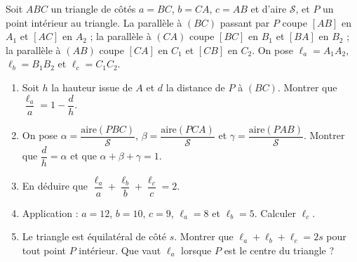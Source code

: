 
Soit $ABC$ un triangle de côtés $a=BC$, $b=CA$, $c=AB$ et d'aire $\mathcal S$, et $P$ un point intérieur au triangle. La parallèle à $(BC)$ passant par $P$ coupe $[AB]$ en $A_1$ et $[AC]$ en $A_2$ ; la parallèle à $(CA)$ coupe $[BC]$ en $B_1$ et $[BA]$ en $B_2$ ; la parallèle à $(AB)$ coupe $[CA]$ en $C_1$ et $[CB]$ en $C_2$. On pose $\ell_a=A_1A_2$, $\ell_b=B_1B_2$ et $\ell_c=C_1C_2$.
\begin{center}
\end{center}
\begin{enumerate}
  \item Soit $h$ la hauteur issue de $A$ et $d$ la distance de $P$ à $(BC)$. Montrer que $\dfrac{\ell_a}a=1-\dfrac dh$.
  \item On pose $\alpha=\dfrac{\text{aire}(PBC)}{\mathcal S}$, $\beta=\dfrac{\text{aire}(PCA)}{\mathcal S}$ et $\gamma=\dfrac{\text{aire}(PAB)}{\mathcal S}$. Montrer que $\dfrac dh=\alpha$ et que $\alpha+\beta+\gamma=1$.
  \item En déduire que $\dfrac{\ell_a}a+\dfrac{\ell_b}b+\dfrac{\ell_c}c=2$.
  \item Application : $a=12$, $b=10$, $c=9$, $\ell_a=8$ et $\ell_b=5$. Calculer $\ell_c$.
  \item Le triangle est équilatéral de côté $s$. Montrer que $\ell_a+\ell_b+\ell_c=2s$ pour tout point $P$ intérieur. Que vaut $\ell_a$ lorsque $P$ est le centre du triangle ?
\end{enumerate}

